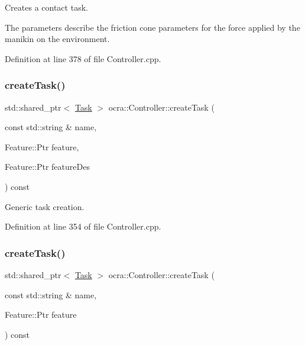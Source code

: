 Creates a contact task. 

The parameters describe the friction cone parameters for the force applied by the manikin on the environment. 

Definition at line 378 of file Controller.\+cpp.

\hypertarget{classocra_1_1Controller_ae57beb4834bb1ed3a2ed292df5e8aedf}{}\label{classocra_1_1Controller_ae57beb4834bb1ed3a2ed292df5e8aedf} 
\subsubsection{\texorpdfstring{create\+Task()}{createTask()}\hspace{0.1cm}{\footnotesize\ttfamily [1/2]}}
{\footnotesize\ttfamily std\+::shared\+\_\+ptr$<$ \hyperlink{classocra_1_1Task}{Task} $>$ ocra\+::\+Controller\+::create\+Task (\begin{DoxyParamCaption}\item[{const std\+::string \&}]{name,  }\item[{Feature\+::\+Ptr}]{feature,  }\item[{Feature\+::\+Ptr}]{feature\+Des }\end{DoxyParamCaption}) const}



Generic task creation. 



Definition at line 354 of file Controller.\+cpp.

\hypertarget{classocra_1_1Controller_ae3546bd282b1bec068d416e06660722f}{}\label{classocra_1_1Controller_ae3546bd282b1bec068d416e06660722f} 
\subsubsection{\texorpdfstring{create\+Task()}{createTask()}\hspace{0.1cm}{\footnotesize\ttfamily [2/2]}}
{\footnotesize\ttfamily std\+::shared\+\_\+ptr$<$ \hyperlink{classocra_1_1Task}{Task} $>$ ocra\+::\+Controller\+::create\+Task (\begin{DoxyParamCaption}\item[{const std\+::string \&}]{name,  }\item[{Feature\+::\+Ptr}]{feature }\end{DoxyParamCaption}) const}



